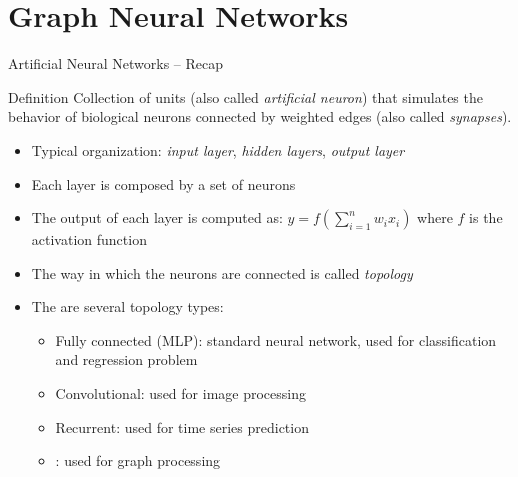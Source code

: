 \documentclass[presentation, 9pt]{beamer}\mode<presentation>{\usetheme{AMSBolognaFC}}
\begin{document}
\section{Graph Neural Networks}
\begin{frame}{Artificial Neural Networks -- Recap}
\begin{alertblock}{Definition}
	Collection of units (also called \emph{artificial neuron}) that simulates the behavior of biological neurons
	connected by weighted edges (also called \emph{synapses}).
\end{alertblock}
\begin{itemize}
	\item Typical organization: \emph{input layer}, \emph{hidden layers}, \emph{output layer}
	\item Each layer is composed by a set of neurons
	\item The output of each layer is computed as: $y = f(\sum_{i=1}^n w_i x_i)$ where $f$ is the activation function
	\item The way in which the neurons are connected is called \emph{topology}
	\item The are several topology types:
	\begin{itemize}
		\item Fully connected (MLP): standard neural network, used for classification and regression problem 
		\item Convolutional: used for image processing
		\item Recurrent: used for time series prediction
		\item {}: used for graph processing
	\end{itemize}
\end{itemize}
\end{frame}
\end{document}
